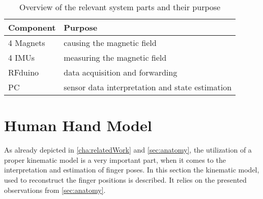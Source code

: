 \begin{table}[h]
\centering
\begin{tabular}{l|l}
\textbf{Component} & \textbf{Purpose} \\ \hline
4 Magnets & causing the magnetic field \\ \hline
4 \acp{IMU} & measuring the magnetic field \\ \hline
RFduino & data acquisition and forwarding \\ \hline
PC & sensor data interpretation and state estimation \\ %
\end{tabular}
\caption[List of system parts]{Overview of the relevant system parts and their purpose}
\label{tab:systemParts}
\end{table}

\FloatBarrier

\section{Human Hand Model} \label{sec:handModel}

As already depicted in \ref{cha:relatedWork} and \ref{sec:anatomy}, the utilization of a proper kinematic model is a very important part, when it comes to  the interpretation and estimation of finger poses. In this section the kinematic model, used to reconstruct the finger positions is described. It relies on the presented observations from \ref{sec:anatomy}.

